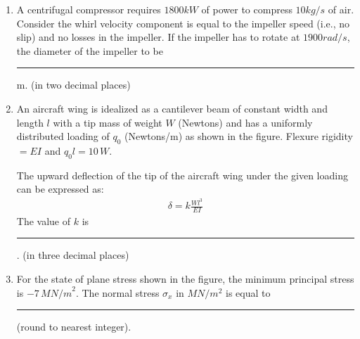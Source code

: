 \documentclass[journal]{IEEEtran}
\begin{document}
\begin{enumerate}[start=40]
\item A centrifugal compressor requires $1800 kW$ of power to compress $10 kg/s$ of air. Consider the whirl velocity component is equal to the impeller speed (i.e., no slip) and no losses in the impeller. If the impeller has to rotate at $1900 rad/s$, the diameter of the impeller to be \rule{1cm}{0.4 pt} m. (in two decimal places) 

\item An aircraft wing is idealized as a cantilever beam of constant width and length $ l $ with a tip mass of weight $ W $ (Newtons) and has a uniformly distributed loading of $ q_0 $ (Newtons/m) as shown in the figure. Flexure rigidity  $= EI $ and $ q_0 l = 10 \, W $.
\begin{center}
    


\end{center}
The upward deflection of the tip of the aircraft wing under the given loading can be expressed as:
\begin{align*}
    \delta=k\frac{Wl^3}{EI}
\end{align*}
The value of $k$  is \rule{1cm}{0.4 pt} . (in three decimal places)


\item For the state of plane stress shown in the figure, the minimum principal stress is $ -7 \, {MN/m}^2 $. The normal stress $ \sigma_x  \text{ in } MN/m^2$ is equal to \rule{1cm}{0.4 pt} (round to nearest integer).


\end{enumerate}
\end{document}
